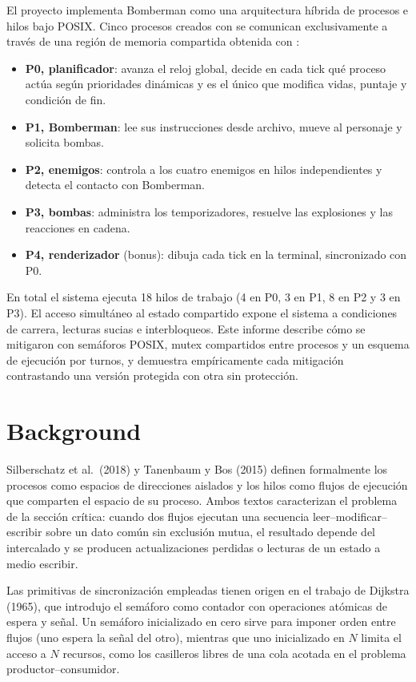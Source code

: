 \documentclass[11pt,a4paper]{article}
\newcommand{\cod}[1]{\texttt{\detokenize{#1}}}
\begin{document}
El proyecto implementa Bomberman como una arquitectura híbrida de procesos e hilos bajo POSIX. Cinco procesos creados con \cod{fork} se comunican exclusivamente a través de una región de memoria compartida obtenida con \cod{mmap}:

\begin{itemize}
  \item \textbf{P0, planificador}: avanza el reloj global, decide en cada tick qué proceso actúa según prioridades dinámicas y es el único que modifica vidas, puntaje y condición de fin.
  \item \textbf{P1, Bomberman}: lee sus instrucciones desde archivo, mueve al personaje y solicita bombas.
  \item \textbf{P2, enemigos}: controla a los cuatro enemigos en hilos independientes y detecta el contacto con Bomberman.
  \item \textbf{P3, bombas}: administra los temporizadores, resuelve las explosiones y las reacciones en cadena.
  \item \textbf{P4, renderizador} (bonus): dibuja cada tick en la terminal, sincronizado con P0.
\end{itemize}

En total el sistema ejecuta 18 hilos de trabajo (4 en P0, 3 en P1, 8 en P2 y 3 en P3). El acceso simultáneo al estado compartido expone el sistema a condiciones de carrera, lecturas sucias e interbloqueos. Este informe describe cómo se mitigaron con semáforos POSIX, mutex compartidos entre procesos y un esquema de ejecución por turnos, y demuestra empíricamente cada mitigación contrastando una versión protegida con otra sin protección.

\section{Background}

Silberschatz et al.\ (2018) y Tanenbaum y Bos (2015) definen formalmente los procesos como espacios de direcciones aislados y los hilos como flujos de ejecución que comparten el espacio de su proceso. Ambos textos caracterizan el problema de la sección crítica: cuando dos flujos ejecutan una secuencia leer--modificar--escribir sobre un dato común sin exclusión mutua, el resultado depende del intercalado y se producen actualizaciones perdidas o lecturas de un estado a medio escribir.

Las primitivas de sincronización empleadas tienen origen en el trabajo de Dijkstra (1965), que introdujo el semáforo como contador con operaciones atómicas de espera y señal. Un semáforo inicializado en cero sirve para imponer orden entre flujos (uno espera la señal del otro), mientras que uno inicializado en $N$ limita el acceso a $N$ recursos, como los casilleros libres de una cola acotada en el problema productor--consumidor.
\end{document}
